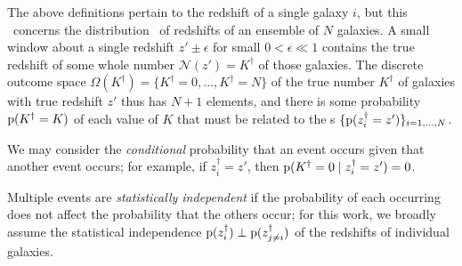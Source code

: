 The above definitions pertain to the redshift of a single galaxy $i$, but this \ concerns the distribution \Nz\ of redshifts of an ensemble of $N$ galaxies.
A small window about a single redshift $z' \pm \epsilon$ for small $0 < \epsilon \ll 1$ contains the true redshift of some whole number ${\mathcal{N}(z') = K^{\dagger}}$ of those galaxies.
The discrete outcome space ${\Omega(K^{\dagger}) = \{K^{\dagger} = 0, \dots, K^{\dagger} = N\}}$ of the true number $K^{\dagger}$ of galaxies with true redshift $z'$ thus has $N + 1$ elements, and there is some probability ${\mathrm{p}(K^{\dagger} = K)}$ of each value of $K$ that must be related to the \pzpdf s ${\{\mathrm{p}(z^{\dagger}_{i} = z')\}_{i = 1, \dots, N}}$.


\begin{definition}\label{def:conditional}
	We may consider the \textit{conditional} probability that an event occurs given that another event occurs;
	for example, if ${z^{\dagger}_{i} = z'}$, then ${\mathrm{p}(K^{\dagger} = 0 \mid z^{\dagger}_{i} = z') = 0}$.
\end{definition}
\begin{definition}\label{def:independence}
	Multiple events are \textit{statistically independent} if the probability of each occurring does not affect the probability that the others occur;
	for this work, we broadly assume the statistical independence ${\mathrm{p}(z^{\dagger}_{i}) \perp \mathrm{p}(z^{\dagger}_{j \neq i})}$ of the redshifts of individual galaxies.
\end{definition}

